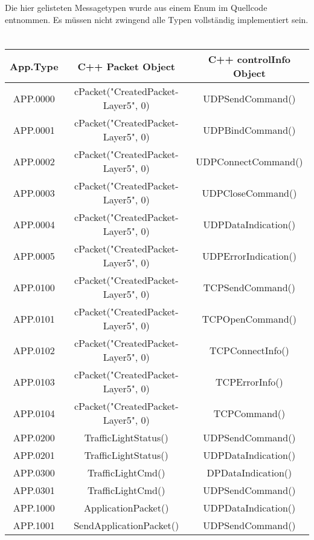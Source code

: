 Die hier gelisteten Messagetypen wurde aus einem Enum im Quellcode entnommen. Es müssen nicht zwingend alle Typen vollständig implementiert sein.
	\section{}
	\begin{tiny}
		\begin{tabular}{|c|c|c|}
			\hline
			\rowcolor{Gainsboro!60}
			App.Type &         C++ Packet Object          & C++ controlInfo Object \\ \hline
			APP.0000 & cPacket("CreatedPacket-Layer5", 0) & UDPSendCommand()       \\ \hline
			APP.0001 & cPacket("CreatedPacket-Layer5", 0) & UDPBindCommand()       \\ \hline
			APP.0002 & cPacket("CreatedPacket-Layer5", 0) & UDPConnectCommand()    \\ \hline
			APP.0003 & cPacket("CreatedPacket-Layer5", 0) & UDPCloseCommand()      \\ \hline
			APP.0004 & cPacket("CreatedPacket-Layer5", 0) & UDPDataIndication()    \\ \hline
			APP.0005 & cPacket("CreatedPacket-Layer5", 0) & UDPErrorIndication()   \\ \hline
			APP.0100 & cPacket("CreatedPacket-Layer5", 0) & TCPSendCommand()       \\ \hline
			APP.0101 & cPacket("CreatedPacket-Layer5", 0) & TCPOpenCommand()       \\ \hline
			APP.0102 & cPacket("CreatedPacket-Layer5", 0) & TCPConnectInfo()       \\ \hline
			APP.0103 & cPacket("CreatedPacket-Layer5", 0) & TCPErrorInfo()         \\ \hline
			APP.0104 & cPacket("CreatedPacket-Layer5", 0) & TCPCommand()           \\ \hline
			APP.0200 &        TrafficLightStatus()\footnotemark[1]      & UDPSendCommand()       \\ \hline
			APP.0201 &        TrafficLightStatus()\footnotemark[1]     & UDPDataIndication()    \\ \hline
			APP.0300 &         TrafficLightCmd()\footnotemark[1]        & DPDataIndication()     \\ \hline
			APP.0301 &         TrafficLightCmd()\footnotemark[1]        & UDPSendCommand()       \\ \hline
			APP.1000 &        ApplicationPacket()         & UDPDataIndication()    \\ \hline
			APP.1001 &      SendApplicationPacket()       & UDPSendCommand()       \\ \hline
		\end{tabular}
	\end{tiny}
